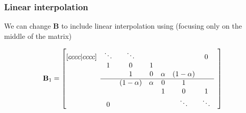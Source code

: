 \documentclass[dvipsnames]{article}
\begin{document}
\subsubsection{Linear interpolation}
We can change $\mathbf{B}$ to include linear interpolation using (focusing only on the middle of the matrix)

\begin{equation}
    \mathbf{B}_1 = \begin{bmatrix}[cccc|cccc]
     & \ddots  &\ddots & & & & 0 & \\
       & 1 & 0 & 1 & & & & \\
      & & 1 & 0 & \alpha & (1-\alpha) & \\ \cline{2-7}
      & & (1-\alpha) & \alpha &0 & 1 & & \\
         & & & &1 & 0 & 1  \\
         & 0 & &  &  &\ddots & \ddots &
    \end{bmatrix}
\end{equation}
\end{document}
